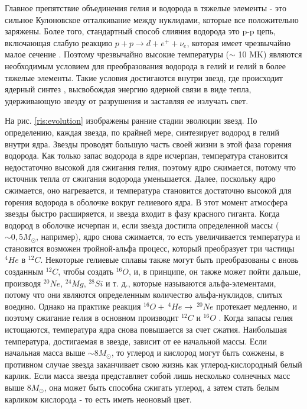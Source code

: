 \documentclass[14pt, a4paper]{article}
\numberwithin{figure}{section}
\numberwithin{equation}{section}
\begin{document}
Главное препятствие объединения гелия и водорода в тяжелые элементы - это сильное Кулоновское отталкивание между нуклидами, которые все положительно заряжены. Более того, стандартный способ слияния водорода это p-p цепь, включающая слабую реакцию $p + p \rightarrow d + e^+ + \nu_e$, которая имеет чрезвычайно малое сечение \cite{cauldrons}. Поэтому чрезвычайно высокие температуры ($\sim$ 10 MK) являются необходимым условием для преобразования водорода в гелий и гелий в более тяжелые элементы. Такие условия достигаются внутри звезд, где происходит ядерный синтез \cite{energy}, высвобождая энергию ядерной связи в виде тепла, удерживающую звезду от разрушения и заставляя ее излучать свет.

На рис. \ref{ris:evolution} изображены ранние стадии эволюции звезд. По определению, каждая звезда, по крайней мере, синтезирует водород в гелий внутри ядра. Звезды проводят большую часть своей жизни в этой фаза горения водорода. Как только запас водорода в ядре исчерпан, температура становится недостаточно высокой для сжигания гелия, поэтому ядро сжимается, потому что источник тепла от сжигания водорода уменьшается. Далее, поскольку ядро сжимается, оно нагревается, и температура становится достаточно высокой для горения водорода в оболочке вокруг гелиевого ядра. В этот момент атмосфера звезды быстро расширяется, и звезда входит в фазу красного гиганта. Когда водород в оболочке исчерпан и, если звезда достигла определенной массы ($\sim 0,5 M_\odot$, например), ядро снова сжимается, то есть увеличивается температура и становится возможен тройной-альфа процесс, который  преобразует три частицы $^4He$ в $^{12}C$. Некоторые гелиевые сплавы также могут быть преобразованы с вновь созданным $^{12}C$, чтобы создать $^{16}O$, и, в принципе, он также может пойти дальше, производя $^{20}Ne$, $^{24}Mg$, $^{28}Si$ и т. д., которые называются альфа-элементами, потому что они являются определенным количество альфа-нуклидов, слитых воедино. Однако на практике реакция $^{16}O + \ ^4He \rightarrow \ ^{20}Ne$ протекает медленно, и поэтому сжигание гелия в основном производит $^{12}C$ и $^{16}O$ \cite{interiors}. Когда запасы гелия истощаются, температура ядра снова повышается за счет сжатия. Наибольшая температура, достигаемая в звезде, зависит от ее начальной массы. Если начальная масса выше $\sim 8 M_\odot$, то углерод и кислород могут быть сожжены, в противном случае звезда заканчивает свою жизнь как углерод-кислородный белый карлик. Если масса звезда представляет собой лишь несколько солнечных масс выше $8 M_\odot$, она может быть способна сжигать углерод, а затем стать белым карликом кислорода - то есть иметь неоновый цвет.
\end{document}
